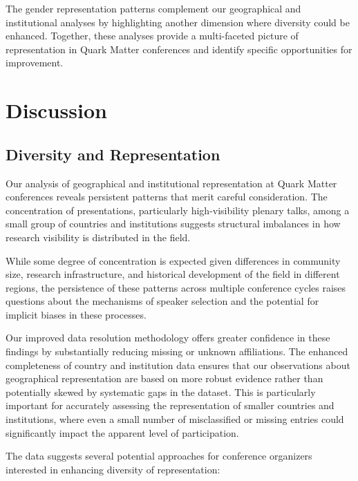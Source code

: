 \documentclass[a4paper,11pt]{article}
\begin{document}
The gender representation patterns complement our geographical and institutional analyses by highlighting another dimension where diversity could be enhanced. Together, these analyses provide a multi-faceted picture of representation in Quark Matter conferences and identify specific opportunities for improvement.

\section{Discussion}

\subsection{Diversity and Representation}

Our analysis of geographical and institutional representation at Quark Matter conferences reveals persistent patterns that merit careful consideration. The concentration of presentations, particularly high-visibility plenary talks, among a small group of countries and institutions suggests structural imbalances in how research visibility is distributed in the field.

While some degree of concentration is expected given differences in community size, research infrastructure, and historical development of the field in different regions, the persistence of these patterns across multiple conference cycles raises questions about the mechanisms of speaker selection and the potential for implicit biases in these processes.

Our improved data resolution methodology offers greater confidence in these findings by substantially reducing missing or unknown affiliations. The enhanced completeness of country and institution data ensures that our observations about geographical representation are based on more robust evidence rather than potentially skewed by systematic gaps in the dataset. This is particularly important for accurately assessing the representation of smaller countries and institutions, where even a small number of misclassified or missing entries could significantly impact the apparent level of participation.

The data suggests several potential approaches for conference organizers interested in enhancing diversity of representation:
\end{document}
